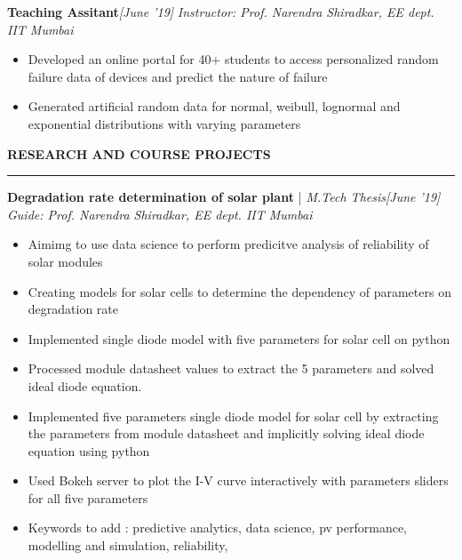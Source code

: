 \documentclass[10 pt]{article}%
\begin{document}
{\flushleft \bf {\large{Teaching Assitant}}}\hfill {{{\em{[June '19]}}}}
\vspace{-0.8em}
{\flushleft \em{Instructor: Prof. Narendra Shiradkar, EE dept. IIT Mumbai}}
\vspace{-5pt}
\begin{itemize}[leftmargin=*]
	\setlength\itemsep{1.5pt}
	\setlength\parskip{1.5pt}
	\item Developed an online portal for 40+ students to access personalized random failure data of devices and predict the nature of failure
	\item Generated artificial random data for normal, weibull, lognormal and exponential distributions with varying parameters
\end{itemize}
\begin{flushleft}\bf{\Large{\textcolor{color2}{RESEARCH AND COURSE PROJECTS}}}\end{flushleft}
\vspace{-5pt}
\hrule
\vspace{1 pt}
{\flushleft \textbf {\large{Degradation rate determination of solar plant}} |\em{ M.Tech Thesis}}\hfill {{{\em{[June '19]}}}}
\vspace{-0.8em}
{\flushleft \em{Guide: Prof. Narendra Shiradkar, EE dept. IIT Mumbai}}
\vspace{-5pt}
\begin{itemize}[leftmargin=*]
	\setlength\itemsep{1.5pt}
	\setlength\parskip{1.5pt}
	\item Aimimg to use data science to perform predicitve analysis of reliability of solar modules
	\item Creating models for solar cells to determine the dependency of parameters on degradation rate
	\item Implemented single diode model with five parameters for solar cell on python 
	\item Processed module datasheet values to extract the 5 parameters and solved ideal diode equation.
	\item Implemented five parameters single diode model for solar cell by extracting the parameters from module datasheet and implicitly solving ideal diode equation using python
	\item Used Bokeh server to plot the I-V curve interactively with parameters sliders for all five parameters
	\item Keywords to add : predictive analytics, data science, pv performance, modelling and simulation, reliability,
\end{itemize}
\end{document}
